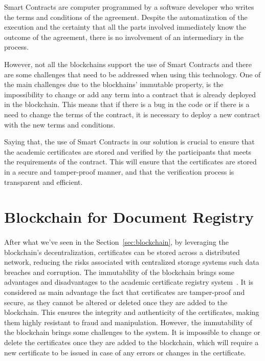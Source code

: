 Smart Contracts are computer programmed by a software developer who writes the terms and conditions of the agreement. Despite the automatization of the execution and the certainty that all the parts
involved immediately know the outcome of the agreement, there is no involvement of an intermediary in the process.

However, not all the blockchains support the use of Smart Contracts and there are some challenges that need to be addressed when using this technology.
One of the main challenges due to the blockhains' immutable property, is the impossibility to change or add any term into a contract that is already deployed in the blockchain.
This means that if there is a bug in the code or if there is a need to change the terms of the contract, it is necessary to deploy a new contract with the new terms and conditions.

Saying that, the use of Smart Contracts in our solution is crucial to ensure that the academic certificates are stored and verified by the participants that meets the requirements of the contract.
This will ensure that the certificates are stored in a secure and tamper-proof manner, and that the verification process is transparent and efficient.

\section{Blockchain for Document Registry}\label{sec:blockchain-academic-certificate-registry}
\paragraph{}

After what we've seen in the Section~\ref{sec:blockchain}, by leveraging the blockchain's decentralization, certificates can be stored across a distributed network,
reducing the risks associated with centralized storage systems such data breaches and corruption.
The immutability of the blockchain brings some advantages and disadvantages to the academic certificate registry system~\cite{nzuva2019smart}.
It is considered as main advantage the fact that certificates are tamper-proof and secure, as they cannot be altered or deleted once they are added to the blockchain. This ensures the
integrity and authenticity of the certificates, making them highly resistant to fraud and manipulation.
However, the immutability of the blockchain brings some challenges to the system. It is impossible to change or delete the certificates once they are added to the blockchain, which will
require a new certificate to be issued in case of any errors or changes in the certificate.

